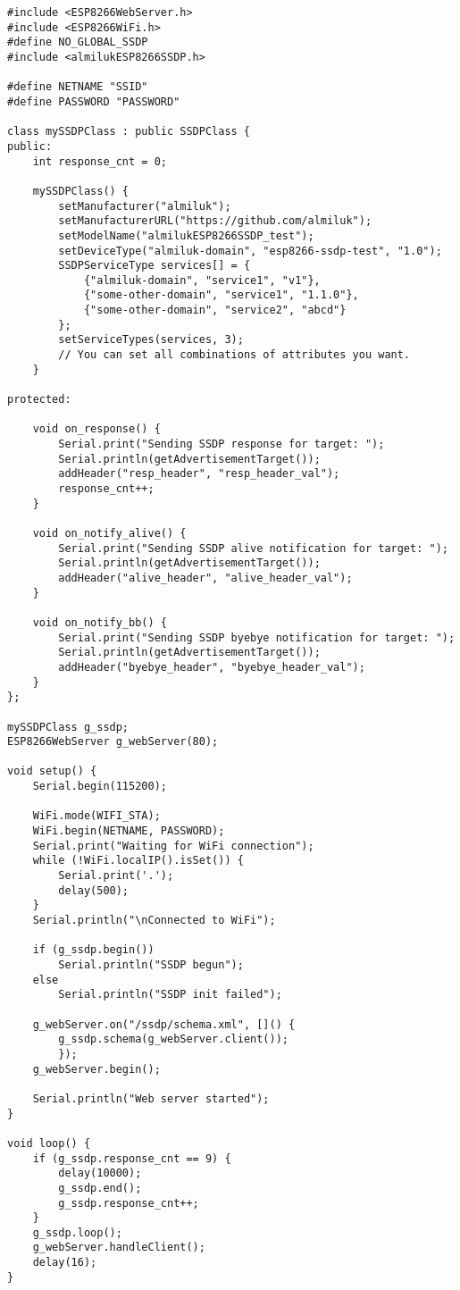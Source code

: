 \begin{verbatim}
#include <ESP8266WebServer.h>
#include <ESP8266WiFi.h>
#define NO_GLOBAL_SSDP
#include <almilukESP8266SSDP.h>

#define NETNAME "SSID"
#define PASSWORD "PASSWORD"

class mySSDPClass : public SSDPClass {
public:
	int response_cnt = 0;

	mySSDPClass() {
		setManufacturer("almiluk");
		setManufacturerURL("https://github.com/almiluk");
		setModelName("almilukESP8266SSDP_test");
		setDeviceType("almiluk-domain", "esp8266-ssdp-test", "1.0");
		SSDPServiceType services[] = {
			{"almiluk-domain", "service1", "v1"},
			{"some-other-domain", "service1", "1.1.0"},
			{"some-other-domain", "service2", "abcd"}
		};
		setServiceTypes(services, 3);
		// You can set all combinations of attributes you want.
	}

protected:

	void on_response() {
		Serial.print("Sending SSDP response for target: ");
		Serial.println(getAdvertisementTarget());
		addHeader("resp_header", "resp_header_val");
		response_cnt++;
	}

	void on_notify_alive() {
		Serial.print("Sending SSDP alive notification for target: ");
		Serial.println(getAdvertisementTarget());
		addHeader("alive_header", "alive_header_val");
	}

	void on_notify_bb() {
		Serial.print("Sending SSDP byebye notification for target: ");
		Serial.println(getAdvertisementTarget());
		addHeader("byebye_header", "byebye_header_val");
	}
};

mySSDPClass g_ssdp;
ESP8266WebServer g_webServer(80);

void setup() {
	Serial.begin(115200);

	WiFi.mode(WIFI_STA);
	WiFi.begin(NETNAME, PASSWORD);
	Serial.print("Waiting for WiFi connection");
	while (!WiFi.localIP().isSet()) {
		Serial.print('.');
		delay(500);
	}
	Serial.println("\nConnected to WiFi");

	if (g_ssdp.begin())
		Serial.println("SSDP begun");
	else
		Serial.println("SSDP init failed");

	g_webServer.on("/ssdp/schema.xml", []() {
		g_ssdp.schema(g_webServer.client());
		});
	g_webServer.begin();

	Serial.println("Web server started");
}

void loop() {
	if (g_ssdp.response_cnt == 9) {
		delay(10000);
		g_ssdp.end();
		g_ssdp.response_cnt++;
	} 
	g_ssdp.loop();
	g_webServer.handleClient();
	delay(16);
}
\end{verbatim}


